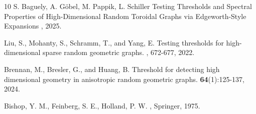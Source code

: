 \documentclass{article}
\begin{document}
\begin{thebibliography}{10}
    S. Baguely, A. G\"obel, M. Pappik, L. Schiller
    \newblock Testing Thresholds and Spectral Properties of High-Dimensional Random Toroidal Graphs via Edgeworth-Style Expansions
    , 2025.

    Liu, S., Mohanty, S., Schramm, T., and Yang, E.
    \newblock Testing thresholds for high-dimensional sparse random geometric graphs.
    , 672-677, 2022.

    Brennan, M., Bresler, G., and Huang, B.
    \newblock Threshold for detecting high dimensional geometry in anisotropic random geometric graphs.
     \textbf{64}(1):125-137, 2024.

    Bishop, Y. M., Feinberg, S. E., Holland, P. W.
    ,
    \newblock Springer, 1975.

    \end{thebibliography}
\endgroup
\end{document}
